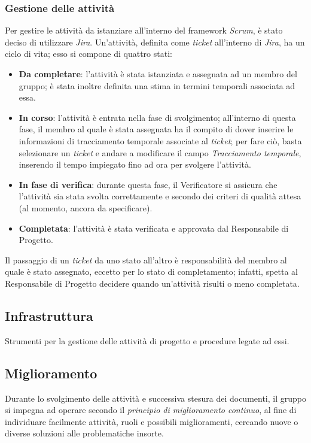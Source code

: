 \subsubsection{Gestione delle attività}
Per gestire le attività da istanziare all'interno del framework \textit{Scrum}, è stato deciso di utilizzare \textit{Jira}. Un'attività, definita come \textit{ticket} all'interno di \textit{Jira}, ha un ciclo di vita; esso si compone di quattro stati:

\begin{itemize}
    \item \textbf{Da completare}: l'attività è stata istanziata e assegnata ad un membro del gruppo; è stata inoltre definita una stima in termini temporali associata ad essa.
    \item \textbf{In corso}: l'attività è entrata nella fase di svolgimento; all'interno di questa fase, il membro al quale è stata assegnata ha il compito di dover inserire le informazioni di tracciamento temporale associate al \textit{ticket}; per fare ciò, basta selezionare un \textit{ticket} e andare a modificare il campo \textit{Tracciamento temporale}, inserendo il tempo impiegato fino ad ora per svolgere l'attività.
    \item \textbf{In fase di verifica}: durante questa fase, il Verificatore si assicura che l'attività sia stata svolta correttamente e secondo dei criteri di qualità attesa (al momento, ancora da specificare).
    \item \textbf{Completata}: l'attività è stata verificata e approvata dal Responsabile di Progetto.
\end{itemize}
Il passaggio di un \textit{ticket} da uno stato all'altro è responsabilità del membro al quale è stato assegnato, eccetto per lo stato di completamento; infatti, spetta al Responsabile di Progetto decidere quando un'attività risulti o meno completata.

\subsection{Infrastruttura}
Strumenti per la gestione delle attività di progetto e procedure legate ad essi.
\subsection{Miglioramento}
Durante lo svolgimento delle attività e successiva stesura dei documenti, il gruppo si impegna ad operare secondo il \textit{principio di miglioramento continuo}, al fine di individuare facilmente attività, ruoli e possibili miglioramenti, cercando nuove o diverse soluzioni alle problematiche insorte.
